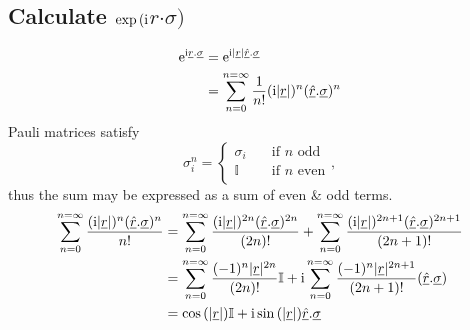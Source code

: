 \documentclass[main.tex]{subfiles}
\begin{document}
\subsection{Calculate $\exp{{(\mathrm{i}}}$\underline{$r$}$\cdot$\underline{$\sigma$}$)$}
\begin{align}
\operatorname{e}^{\mathrm{i}\underline{r}.\underline{\sigma}}&=\operatorname{e}^{\mathrm{i}|\underline{r}|\underline{\hat{r}}.\underline{\sigma}}\\
&=\sum_{n=0}^{n=\infty}{\frac{1}{n!}(\mathrm{i}|\underline{r}|)^n(\underline{\hat{r}}.\underline{\sigma})^n}
\end{align}
Pauli matrices satisfy
\begin{equation}
\sigma_i^n = \begin{cases} \sigma_i & \quad \text{if } n \text{ odd}\\ \mathbb{I} & \quad \text{if } n \text{ even}\\ \end{cases},
\end{equation}
thus the sum may be expressed as a sum of even \& odd terms.
\begin{align}
\sum_{n=0}^{n=\infty}{\frac{(\mathrm{i}|\underline{r}|)^n(\underline{\hat{r}}.\underline{\sigma})^n}{n!}}&=\sum_{n=0}^{n=\infty}{\frac{(\mathrm{i}|\underline{r}|)^{2n}(\underline{\hat{r}}.\underline{\sigma})^{2n}}{(2n)!}}+\sum_{n=0}^{n=\infty}{\frac{(\mathrm{i}|\underline{r}|)^{2n+1}(\underline{\hat{r}}.\underline{\sigma})^{2n+1}}{(2n+1)!}}\\
&=\sum_{n=0}^{n=\infty}{\frac{(-1)^{n}|\underline{r}|^{2n}}{(2n)!}}\mathbb{I}+\mathrm{i}\sum_{n=0}^{n=\infty}{\frac{(-1)^n|\underline{r}|^{2n+1}}{(2n+1)!}}(\underline{\hat{r}}.\underline{\sigma})\\
&=\cos{(|\underline{r}|)}\mathbb{I}+\mathrm{i}\sin{(|\underline{r}|)}\underline{\hat{r}}.\underline{\sigma}
\end{align}
\end{document}
